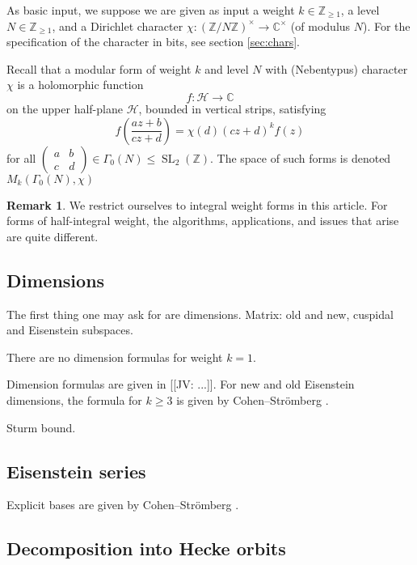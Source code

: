 \documentclass[11pt]{amsart}
\numberwithin{equation}{subsection}
\theoremstyle{plain}
\theoremstyle{definition}
\newtheorem{rmk}[equation]{Remark}
\newcommand{\Z}{\mathbb{Z}}
\newcommand{\C}{\mathbb{C}}
\newcommand{\defi}[1]{\textsf{#1}} 	%
\DeclareMathOperator{\SL}{SL}
\newcommand{\jv}[1]{{\color{red} \textsf{[[JV: #1]]}}}
\begin{document}
As basic input, we suppose we are given as input a weight $k \in \Z_{\geq 1}$, a level $N \in \Z_{\geq 1}$, and a Dirichlet character $\chi \colon (\Z/N\Z)^\times \to \C^\times$ (of modulus $N$).  For the specification of the character in bits, see section \ref{sec:chars}.  

Recall that a \defi{modular form} of weight $k$ and level $N$ with (Nebentypus) character $\chi$ is a holomorphic function
\[ f \colon \mathcal{H} \to \C \]
on the upper half-plane $\mathcal{H}$, bounded in vertical strips, satisfying
\[ f\left(\frac{az+b}{cz+d}\right)=\chi(d)(cz+d)^k f(z) \]
for all $\begin{pmatrix} a & b \\ c & d \end{pmatrix} \in \Gamma_0(N) \leq \SL_2(\Z)$.  The space of such forms is denoted $M_k(\Gamma_0(N),\chi)$

\begin{rmk}
We restrict ourselves to integral weight forms in this article.  For forms of half-integral weight, the algorithms, applications, and issues that arise are quite different.  
\end{rmk}

\subsection{Dimensions}

The first thing one may ask for are dimensions.  Matrix: old and new, cuspidal and Eisenstein subspaces.

There are no dimension formulas for weight $k=1$.

Dimension formulas are given in \jv{...}.  For new and old Eisenstein dimensions, the formula for $k \geq 3$ is given by Cohen--Str\"omberg \cite[Propositions 7.5.14 and 7.5.20]{CohenStroemberg}.

Sturm bound.

\subsection{Eisenstein series}

Explicit bases are given by Cohen--Str\"omberg \cite[Theorem 7.5.16 and 7.5.21]{CohenStroemberg}.

\subsection{Decomposition into Hecke orbits}
\end{document}
